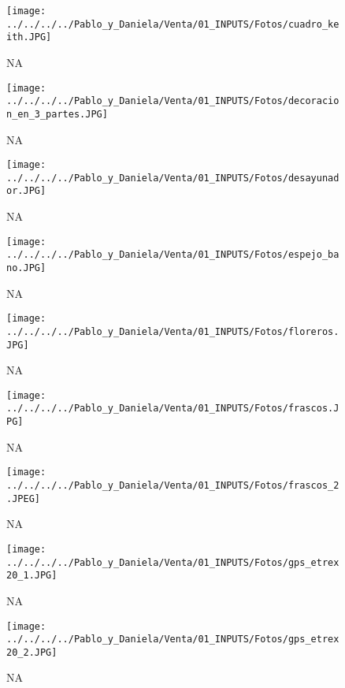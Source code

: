 \documentclass[
]{article}
\begin{document}
\pagebreak

\begin{figure}
\centering
\texttt{[image: ../../../../Pablo\_y\_Daniela/Venta/01\_INPUTS/Fotos/cuadro\_keith.JPG]}
\caption{NA}
\end{figure}

\pagebreak

\begin{figure}
\centering
\texttt{[image: ../../../../Pablo\_y\_Daniela/Venta/01\_INPUTS/Fotos/decoracion\_en\_3\_partes.JPG]}
\caption{NA}
\end{figure}

\pagebreak

\begin{figure}
\centering
\texttt{[image: ../../../../Pablo\_y\_Daniela/Venta/01\_INPUTS/Fotos/desayunador.JPG]}
\caption{NA}
\end{figure}

\pagebreak

\begin{figure}
\centering
\texttt{[image: ../../../../Pablo\_y\_Daniela/Venta/01\_INPUTS/Fotos/espejo\_bano.JPG]}
\caption{NA}
\end{figure}

\pagebreak

\begin{figure}
\centering
\texttt{[image: ../../../../Pablo\_y\_Daniela/Venta/01\_INPUTS/Fotos/floreros.JPG]}
\caption{NA}
\end{figure}

\pagebreak

\begin{figure}
\centering
\texttt{[image: ../../../../Pablo\_y\_Daniela/Venta/01\_INPUTS/Fotos/frascos.JPG]}
\caption{NA}
\end{figure}

\pagebreak

\begin{figure}
\centering
\texttt{[image: ../../../../Pablo\_y\_Daniela/Venta/01\_INPUTS/Fotos/frascos\_2.JPEG]}
\caption{NA}
\end{figure}

\pagebreak

\begin{figure}
\centering
\texttt{[image: ../../../../Pablo\_y\_Daniela/Venta/01\_INPUTS/Fotos/gps\_etrex20\_1.JPG]}
\caption{NA}
\end{figure}

\pagebreak

\begin{figure}
\centering
\texttt{[image: ../../../../Pablo\_y\_Daniela/Venta/01\_INPUTS/Fotos/gps\_etrex20\_2.JPG]}
\caption{NA}
\end{figure}
\end{document}
